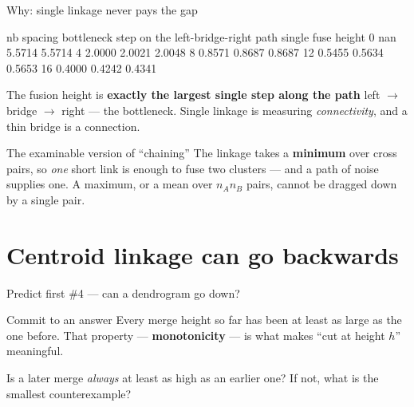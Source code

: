 \documentclass[aspectratio=169]{beamer}
\begin{document}
\begin{frame}[fragile,shrink=5]{Why: single linkage never pays the gap}
\begin{outblk}
  nb  spacing  bottleneck step on the left-bridge-right path  single fuse height
   0      nan                          5.5714               5.5714
   4   2.0000                          2.0021               2.0048
   8   0.8571                          0.8687               0.8687
  12   0.5455                          0.5634               0.5653
  16   0.4000                          0.4242               0.4341
\end{outblk}
  \vspace{0.3em}
  \begin{exampleblock}{}
    \centering
    The fusion height is \textbf{exactly the largest single step along the
    path} left $\to$ bridge $\to$ right --- the bottleneck. Single linkage is
    measuring \emph{connectivity}, and a thin bridge is a connection.
  \end{exampleblock}
  \begin{alertblock}{The examinable version of ``chaining''}
    \centering\small
    The linkage takes a \textbf{minimum} over cross pairs, so \emph{one} short
    link is enough to fuse two clusters --- and a path of noise supplies one.
    A maximum, or a mean over $n_A n_B$ pairs, cannot be dragged down by a
    single pair.
  \end{alertblock}
\end{frame}

\section[Inversions]{Centroid linkage can go backwards}
\label{sec:inv}

\begin{frame}{Predict first \#4 --- can a dendrogram go down?}
  \begin{alertblock}{Commit to an answer}
    Every merge height so far has been at least as large as the one before.
    That property --- \textbf{monotonicity} --- is what makes ``cut at height
    $h$'' meaningful.

    \medskip
    \centering\large
    Is a later merge \emph{always} at least as high as an earlier one? If not,
    what is the smallest counterexample?
  \end{alertblock}
\end{frame}
\end{document}
